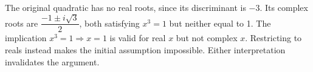 The original quadratic has no real roots, since its discriminant is $-3$. Its complex roots are $\dfrac{-1\pm i\sqrt3}{2}$, both satisfying $x^3=1$ but neither equal to 1. The implication $x^3=1\Rightarrow x=1$ is valid for real $x$ but not complex $x$. Restricting to reals instead makes the initial assumption impossible. Either interpretation invalidates the argument.
